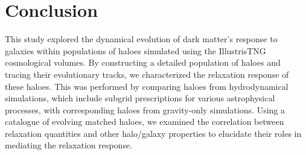












\section{Conclusion}
\label{sec:conclusion}

This study explored the dynamical evolution of dark matter's response to galaxies within populations of haloes simulated using the IllustrisTNG cosmological volumes. By constructing a detailed population of haloes and tracing their evolutionary tracks, we characterized the relaxation response of these haloes. This was performed by comparing haloes from hydrodynamical simulations, which include subgrid prescriptions for various astrophysical processes, with corresponding haloes from gravity-only simulations. Using a catalogue of evolving matched haloes, we examined the correlation between relaxation quantities and other halo/galaxy properties to elucidate their roles in mediating the relaxation response.


